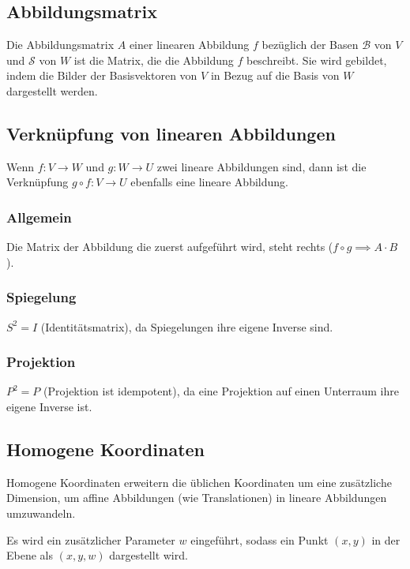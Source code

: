 \documentclass{article}
\begin{document}
\begin{minipage}[t]{0.45\textwidth}
    \subsection*{Abbildungsmatrix}
    Die Abbildungsmatrix \( A \) einer linearen Abbildung \( f \) bezüglich der Basen \( \mathcal{B} \) von \( V \) und \( \mathcal{S} \) von \( W \) ist die Matrix, 
    die die Abbildung \( f \) beschreibt. Sie wird gebildet, indem die Bilder der Basisvektoren von \( V \) in Bezug auf die Basis von \( W \) dargestellt werden.

    \subsection*{Verknüpfung von linearen Abbildungen}
    Wenn \( f: V \to W \) und \( g: W \to U \) zwei lineare Abbildungen sind, dann ist die Verknüpfung \( g \circ f: V \to U \) ebenfalls eine lineare Abbildung.

    \subsubsection*{Allgemein}
    Die Matrix der Abbildung die zuerst aufgeführt wird, steht rechts ($f \circ g \implies A \cdot B$).

    \subsubsection*{Spiegelung}
    $S^2 = I$ (Identitätsmatrix), da Spiegelungen ihre eigene Inverse sind.

    \subsubsection*{Projektion}
    $P^2 = P$ (Projektion ist idempotent), da eine Projektion auf einen Unterraum ihre eigene Inverse ist.

    \subsection*{Homogene Koordinaten}
    Homogene Koordinaten erweitern die üblichen Koordinaten um eine zusätzliche Dimension, um affine Abbildungen (wie Translationen) in lineare Abbildungen umzuwandeln.
    
    Es wird ein zusätzlicher Parameter \( w \) eingeführt, sodass ein Punkt \( (x, y) \) in der Ebene als \( (x, y, w) \) dargestellt wird.
\end{minipage}
\end{document}
